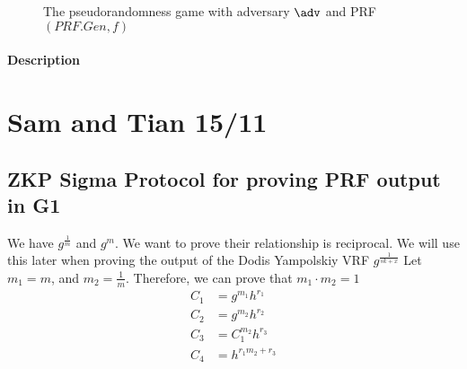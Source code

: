 \begin{figure}
\begin{pchstack}[boxed, center, space=1em]
\end{pchstack}
  \caption{The pseudorandomness game with adversary $\adv$ and PRF $(PRF.Gen, f)$}
  \label{fig:prf}
\end{figure}

\paragraph{Description}










\newpage
\section{Sam and Tian 15/11}

\subsection{ZKP Sigma Protocol for proving PRF output in G1}
We have $g^{\frac{1}{m}}$ and $g^m$. We want to prove their relationship is reciprocal. We will use this later when proving the output of the Dodis Yampolskiy VRF $g^{\frac{1}{sk + x}}$
Let $m_1 = m$, and $m_2 = \frac{1}{m}$. Therefore, we can prove that $m_1 \cdot m_2 = 1$ 
\[ 
    \begin{aligned}
        C_1 &= g^{m_1}h^{r_1} \\
        C_2 &= g^{m_2}h^{r_2} \\
        C_3 &= C_1^{m_2}h^{r_3} \\ 
        C_4 &= h^{r_1m_2 + r_3} \\ 
    \end{aligned}
\]

